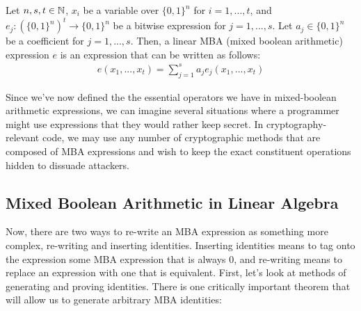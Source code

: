  {Let $n,s,t \in \mathbb{N}$, $x_i$ be a variable over $\{0,1\}^n$ for
$i = 1,...,t$, and $e_j : (\{0,1\}^n)^t \rightarrow \{0,1\}^n$ be a bitwise expression for
$j = 1,...,s$. Let $a_j\in \{0,1\}^n$ be a coefficient for $j = 1,...,s$.
Then, a linear MBA (mixed boolean arithmetic) expression $e$ is an expression that can be written as follows:
\begin{align*}
    e(x_1, ..., x_t) = \sum_{j=1}^s a_j e_j(x_1,...,x_t)
\end{align*}
}
\par Since we've now defined the the essential operators we have in mixed-boolean 
arithmetic
expressions, we can imagine several situations where a programmer might use expressions 
that they would rather keep secret. In cryptography-relevant code, we may use any
number of cryptographic methods that are composed of MBA 
expressions
and wish to keep the exact constituent operations hidden 
to dissuade attackers. 
\\
\subsection{Mixed Boolean Arithmetic in Linear Algebra}
Now, there are two ways to re-write an MBA expression as something more complex, 
re-writing and inserting identities. Inserting identities means to tag onto
the expression some MBA expression that is always 0, and re-writing means to 
replace an expression with one that is equivalent. First, let's look at methods
of generating and proving identities. There is one critically important theorem 
that will allow us to generate arbitrary MBA identities:

